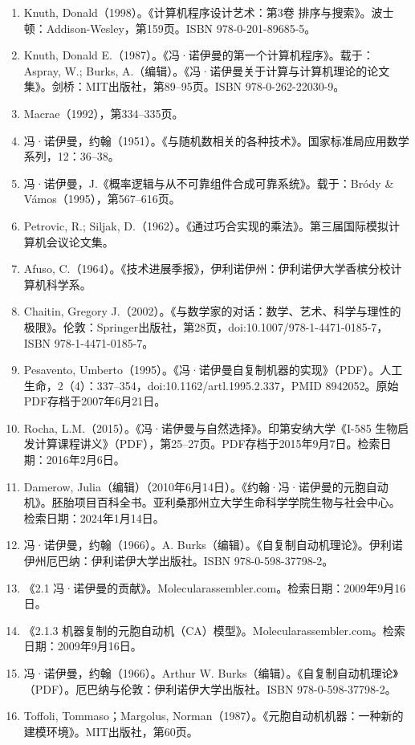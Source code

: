\begin{enumerate}
\item Knuth, Donald（1998）。《计算机程序设计艺术：第3卷 排序与搜索》。波士顿：Addison-Wesley，第159页。ISBN 978-0-201-89685-5。
\item Knuth, Donald E.（1987）。《冯·诺伊曼的第一个计算机程序》。载于：Aspray, W.; Burks, A.（编辑）。《冯·诺伊曼关于计算与计算机理论的论文集》。剑桥：MIT出版社，第89–95页。ISBN 978-0-262-22030-9。  
\item Macrae（1992），第334–335页。  
\item 冯·诺伊曼，约翰（1951）。《与随机数相关的各种技术》。国家标准局应用数学系列，12：36–38。  
\item 冯·诺伊曼，J.《概率逻辑与从不可靠组件合成可靠系统》。载于：Bródy & Vámos（1995），第567–616页。  
\item Petrovic, R.; Siljak, D.（1962）。《通过巧合实现的乘法》。第三届国际模拟计算机会议论文集。  
\item Afuso, C.（1964）。《技术进展季报》，伊利诺伊州：伊利诺伊大学香槟分校计算机科学系。  
\item Chaitin, Gregory J.（2002）。《与数学家的对话：数学、艺术、科学与理性的极限》。伦敦：Springer出版社，第28页，doi:10.1007/978-1-4471-0185-7，ISBN 978-1-4471-0185-7。  
\item Pesavento, Umberto（1995）。《冯·诺伊曼自复制机器的实现》（PDF）。人工生命，2（4）：337–354，doi:10.1162/artl.1995.2.337，PMID 8942052。原始PDF存档于2007年6月21日。
\item Rocha, L.M.（2015）。《冯·诺伊曼与自然选择》。印第安纳大学《I-585 生物启发计算课程讲义》（PDF），第25–27页。PDF存档于2015年9月7日。检索日期：2016年2月6日。  
\item Damerow, Julia（编辑）（2010年6月14日）。《约翰·冯·诺伊曼的元胞自动机》。胚胎项目百科全书。亚利桑那州立大学生命科学学院生物与社会中心。检索日期：2024年1月14日。  
\item 冯·诺伊曼，约翰（1966）。A. Burks（编辑）。《自复制自动机理论》。伊利诺伊州厄巴纳：伊利诺伊大学出版社。ISBN 978-0-598-37798-2。  
\item 《2.1 冯·诺伊曼的贡献》。Molecularassembler.com。检索日期：2009年9月16日。  
\item 《2.1.3 机器复制的元胞自动机（CA）模型》。Molecularassembler.com。检索日期：2009年9月16日。  
\item 冯·诺伊曼，约翰（1966）。Arthur W. Burks（编辑）。《自复制自动机理论》（PDF）。厄巴纳与伦敦：伊利诺伊大学出版社。ISBN 978-0-598-37798-2。  
\item Toffoli, Tommaso；Margolus, Norman（1987）。《元胞自动机机器：一种新的建模环境》。MIT出版社，第60页。

\end{enumerate}
